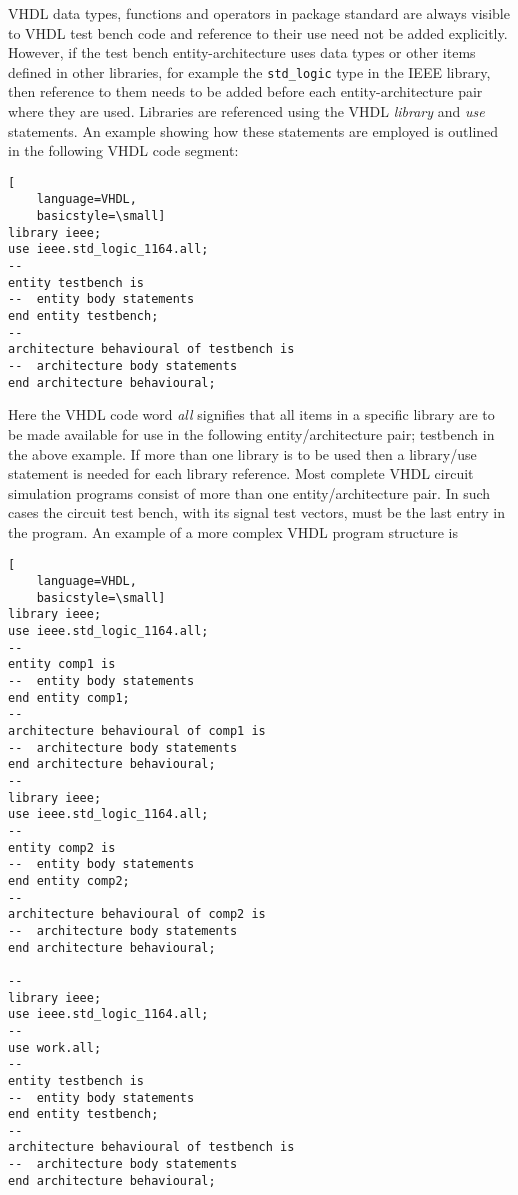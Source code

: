 VHDL data types, functions and operators in package standard are always visible to VHDL test bench code and reference to their use need not be added explicitly. However, if the test bench entity-architecture uses data types or other items defined in other libraries, for example the \verb|std_logic| type in the IEEE library, then reference to them needs to be added before each entity-architecture pair where they are used.  Libraries are referenced using the VHDL \textit{library} and \textit{use} statements.  An example showing how these statements are employed is outlined in the following VHDL code segment:
  
\begin{lstlisting}[
    language=VHDL,
    basicstyle=\small]
library ieee;
use ieee.std_logic_1164.all;
--
entity testbench is
--  entity body statements
end entity testbench;
--
architecture behavioural of testbench is
--  architecture body statements
end architecture behavioural;
\end{lstlisting}

Here the VHDL code word \textit{all} signifies that all items in a specific library are to be made available for use in the following entity/architecture pair; testbench in the above example.  If more than one library is to be used then a library/use statement is needed for each library reference.  Most complete VHDL circuit simulation programs consist of more than one entity/architecture pair.  In such cases the circuit test bench, with its signal test vectors, must be the last entry in the program.  An example of a more complex VHDL program structure is

\begin{lstlisting}[
    language=VHDL,
    basicstyle=\small]
library ieee;
use ieee.std_logic_1164.all;
--
entity comp1 is
--  entity body statements
end entity comp1;
--
architecture behavioural of comp1 is
--  architecture body statements
end architecture behavioural;
--
library ieee;
use ieee.std_logic_1164.all;
--
entity comp2 is
--  entity body statements
end entity comp2;
--
architecture behavioural of comp2 is
--  architecture body statements
end architecture behavioural;

--
library ieee;
use ieee.std_logic_1164.all;
--
use work.all;
--
entity testbench is
--  entity body statements
end entity testbench;
--
architecture behavioural of testbench is
--  architecture body statements
end architecture behavioural;
 \end{lstlisting}

